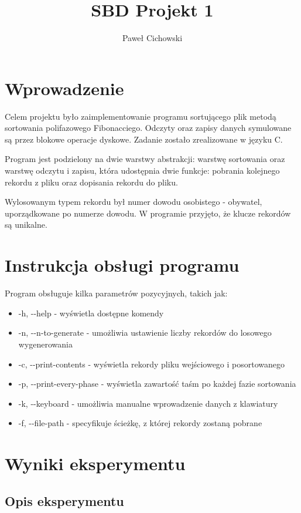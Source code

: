 \documentclass[11pt,a4paper]{article}
\author{Paweł Cichowski}
\date{}
\title{SBD Projekt 1}
\begin{document}
\maketitle

\section{Wprowadzenie}

Celem projektu było zaimplementowanie programu sortującego plik metodą sortowania polifazowego Fibonacciego. Odczyty oraz zapisy danych symulowane są przez blokowe operacje dyskowe. Zadanie zostało zrealizowane w języku C.

Program jest podzielony na dwie warstwy abstrakcji: warstwę sortowania oraz warstwę odczytu i zapisu, która udostępnia dwie funkcje: pobrania kolejnego rekordu z pliku oraz dopisania rekordu do pliku.

Wylosowanym typem rekordu był numer dowodu osobistego - obywatel, uporządkowane po numerze dowodu. W programie przyjęto, że klucze rekordów są unikalne.

\section{Instrukcja obsługi programu}

Program obsługuje kilka parametrów pozycyjnych, takich jak:
\begin{itemize}
\item -h, -{}-help - wyświetla dostępne komendy
\item -n, -{}-n-to-generate - umożliwia ustawienie liczby rekordów do losowego wygenerowania
\item -c, -{}-print-contents - wyświetla rekordy pliku wejściowego i posortowanego
\item -p, -{}-print-every-phase - wyświetla zawartość taśm po każdej fazie sortowania
\item -k, -{}-keyboard - umożliwia manualne wprowadzenie danych z klawiatury
\item -f, -{}-file-path - specyfikuje ścieżkę, z której rekordy zostaną pobrane
\end{itemize}

\section{Wyniki eksperymentu}

\subsection{Opis eksperymentu}
\end{document}
